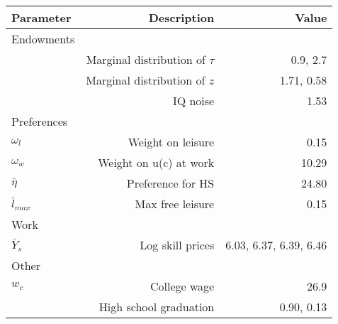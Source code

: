 \begin{tabular}{lrr}
\hline
Parameter & Description  & Value  \\ 
\hline
Endowments &   &   \\ 
 & Marginal distribution of $\tau$  & 0.9, 2.7  \\ 
 & Marginal distribution of $z$  & 1.71, 0.58  \\ 
 & IQ noise  & 1.53  \\ 
Preferences &   &   \\ 
$\omega_{l}$ & Weight on leisure  & 0.15  \\ 
$\omega_{w}$ & Weight on u(c) at work  & 10.29  \\ 
$\bar{\eta}$ & Preference for HS  & 24.80  \\ 
$\bar{l}_{max}$ & Max free leisure  & 0.15  \\ 
Work &   &   \\ 
$\bar{Y}_{s}$ & Log skill prices  & 6.03, 6.37, 6.39, 6.46  \\ 
Other &   &   \\ 
$w_{c}$ & College wage  & 26.9  \\ 
 & High school graduation  & 0.90, 0.13  \\ 
\hline
\end{tabular}%
